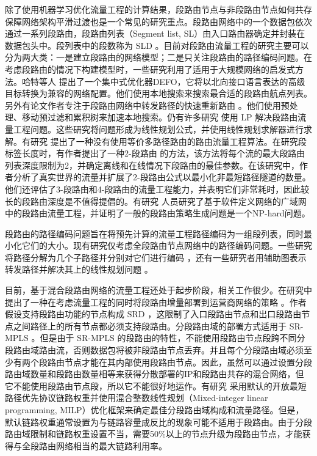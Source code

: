 除了使用机器学习优化流量工程的计算结果，段路由节点与非段路由节点如何共存保障网络架构平滑过渡也是一个常见的研究重点。段路由网络中的一个数据包依次通过一系列段路由，段路由列表（Segment list, SL）由入口路由器确定并封装在数据包头中。段列表中的段数称为 \gls*{SLD} 。目前对段路由流量工程的研究主要可以分为两大类：一是建立段路由的网络模型；二是只关注段路由的路径编码问题。在考虑段路由的情况下构建模型时，一些研究利用了适用于大规模网络的启发式方法。哈特等人 \cite{DEFO} 提出了一个集中式优化器DEFO，它将以北向接口语言表达的高级目标转换为兼容的网络配置。他们使用本地搜索来搜索最合适的段路由航点列表。另外有论文作者专注于段路由网络中转发路径的快速重新路由 \cite{SRFRR1, SRFRR2} 。他们使用预处理、移动预过滤和累积树来加速本地搜索。仍有许多研究 \cite{SRBANDWIDTH8} 使用 \gls*{LP} 解决段路由流量工程问题。这些研究将问题形成为线性规划公式，并使用线性规划求解器进行求解。有研究 \cite{SRBANDWIDTH7} 提出了一种没有使用等价多路径路由的路由流量工程算法。在研究段标签长度时，有作者提出了一种2-段路由 \cite{2SR} 的方法，该方法将每个流的最大段路由列表深度限制为2，并确定离线和在线情况下段路由的最佳参数。在该研究中，作者分析了真实世界的流量并扩展了2-段路由公式以最小化非最短路径隧道的数量。他们还评估了3-段路由和4-段路由的流量工程能力，并表明它们非常耗时，因此较长的段路由深度是不值得提倡的。有研究 \cite{SRBANDWIDTH10} 人员研究了基于软件定义网络的广域网中的段路由流量工程，并证明了一般的段路由策略生成问题是一个NP-hard问题。

段路由的路径编码问题旨在将预先计算的流量工程路径编码为一组段列表，同时最小化它们的大小。现有研究仅考虑全段路由节点网络中的路径编码问题。一些研究将路径分解为几个子路径并分别对它们进行编码 \cite{SRXXXX1, SRXXXX2, SRXXXX3} ，还有一些研究者用辅助图表示转发路径并解决其上的线性规划问题 \cite{SRXXXX4, SRXXXX5} 。

目前，基于混合段路由网络的流量工程还处于起步阶段，相关工作很少。在研究中提出了一种在考虑流量工程的同时将段路由增量部署到运营商网络的策略 \cite{SRXXXX6} 。作者假设支持段路由功能的节点构成 \gls*{SRD} ，这限制了入口段路由节点和出口段路由节点之间路径上的所有节点都必须支持段路由。分段路由域的部署方式适用于 \gls*{SR-MPLS} 。但是由于 \gls*{SR-MPLS} 的段路由的特性，不能使用段路由节点段跨不同分段路由域路由流，否则数据包将被非段路由节点丢弃。并且每个分段路由域必须至少有两个段路由节点才能在其内部使用段路由节点。因此，虽然可以通过设置分段路由域数量和段路由数量相等来获得分散部署的IP和段路由共存的混合网络，但它不能使用段路由节点段，所以它不能很好地运作。有研究 \cite{SRXXXX7} 采用默认的开放最短路径优先协议链路权重并使用混合整数线性规划（Mixed-integer linear programming, MILP）优化框架来确定最佳分段路由域构成和流量路径。但是，默认链路权重通常设置为与链路容量成反比的现象可能不适用于段路由。由于分段路由域限制和链路权重设置不当，需要50\%以上的节点升级为段路由节点，才能获得与全段路由网络相当的最大链路利用率。

